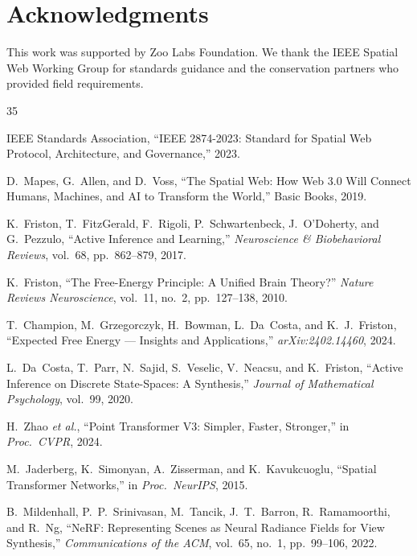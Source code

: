 \documentclass[11pt,letterpaper]{article}
\begin{document}
\section*{Acknowledgments}

This work was supported by Zoo Labs Foundation. We thank the IEEE Spatial Web Working Group for standards guidance and the conservation partners who provided field requirements.


\begin{thebibliography}{35}

IEEE Standards Association, ``IEEE 2874-2023: Standard for Spatial Web Protocol, Architecture, and Governance,'' 2023.

D.~Mapes, G.~Allen, and D.~Voss, ``The Spatial Web: How Web 3.0 Will Connect Humans, Machines, and AI to Transform the World,'' Basic Books, 2019.

K.~Friston, T.~FitzGerald, F.~Rigoli, P.~Schwartenbeck, J.~O'Doherty, and G.~Pezzulo, ``Active Inference and Learning,'' \emph{Neuroscience \& Biobehavioral Reviews}, vol.~68, pp.~862--879, 2017.

K.~Friston, ``The Free-Energy Principle: A Unified Brain Theory?'' \emph{Nature Reviews Neuroscience}, vol.~11, no.~2, pp.~127--138, 2010.

T.~Champion, M.~Grzegorczyk, H.~Bowman, L.~Da~Costa, and K.~J.~Friston, ``Expected Free Energy --- Insights and Applications,'' \emph{arXiv:2402.14460}, 2024.

L.~Da~Costa, T.~Parr, N.~Sajid, S.~Veselic, V.~Neacsu, and K.~Friston, ``Active Inference on Discrete State-Spaces: A Synthesis,'' \emph{Journal of Mathematical Psychology}, vol.~99, 2020.

H.~Zhao \emph{et al.}, ``Point Transformer V3: Simpler, Faster, Stronger,'' in \emph{Proc.\ CVPR}, 2024.

M.~Jaderberg, K.~Simonyan, A.~Zisserman, and K.~Kavukcuoglu, ``Spatial Transformer Networks,'' in \emph{Proc.\ NeurIPS}, 2015.

B.~Mildenhall, P.~P.~Srinivasan, M.~Tancik, J.~T.~Barron, R.~Ramamoorthi, and R.~Ng, ``NeRF: Representing Scenes as Neural Radiance Fields for View Synthesis,'' \emph{Communications of the ACM}, vol.~65, no.~1, pp.~99--106, 2022.


\end{thebibliography}
\end{document}
